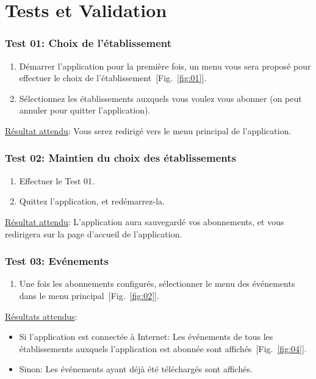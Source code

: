 \chapter{Tests et Validation}
  
  \subsection*{Test 01: Choix de l'établissement}
    \begin{enumerate}
    \item Démarrer l'application pour la première fois, un menu vous sera proposé pour effectuer le choix de l'établissement~[Fig.~\ref{fig:01}].
    \item Sélectionnez les établissements auxquels vous voulez vous abonner (on peut annuler pour quitter l'application).
    \end{enumerate}

    \underline{Résultat attendu}: Vous serez redirigé vers le menu principal de l'application.

  \subsection*{Test 02: Maintien du choix des établissements}
    \begin{enumerate}
    \item Effectuer le Test 01.
    \item Quittez l'application, et redémarrez-la.
    \end{enumerate}

    \underline{Résultat attendu}: L'application aura sauvegardé vos abonnements, et vous redirigera sur la page d'accueil de l'application.

  \subsection*{Test 03: Evénements}
    \begin{enumerate}
    \item Une fois les abonnements configurés, sélectionner le menu des événements dans le menu principal~[Fig.~\ref{fig:02}].
    \end{enumerate}

    \underline{Résultats attendus}:
    \begin{itemize}
    \item Si l'application est connectée à Internet: Les événements de tous les établissements auxquels l'application est abonnée sont affichés~[Fig.~\ref{fig:04}].
    \item Sinon: Les événements ayant déjà été téléchargés sont affichés.
    \end{itemize}

